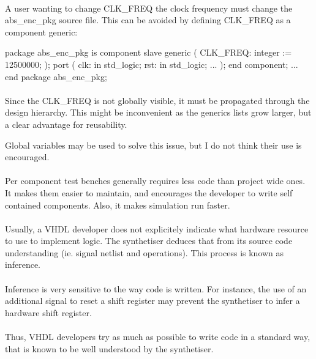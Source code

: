 \documentclass[12pt]{article}
\begin{document}
\paragraph{}
A user wanting to change CLK\_FREQ the clock frequency must change the
abs\_enc\_pkg source file. This can be avoided by defining CLK\_FREQ as
a component generic:
\pagebreak
\begin{vhdl}
package abs_enc_pkg is
component slave
generic
(
 CLK_FREQ: integer := 12500000;
);
port
(
 clk: in std_logic;
 rst: in std_logic;
 ...
);
end component;
...
end package abs_enc_pkg;
\end{vhdl}

\paragraph{}
Since the CLK\_FREQ is not globally visible, it must be propagated
through the design hierarchy. This might be inconvenient as the generics
lists grow larger, but a clear advantage for reusability.

\todo
{
 Global variables may be used to solve this issue,
 but I do not think their use is encouraged.
}


\paragraph{}
Per component test benches generally requires less code than
project wide ones. It makes them easier to maintain, and
encourages the developer to write self contained components.
Also, it makes simulation run faster.


\paragraph{}
Usually, a VHDL developer does not explicitely indicate what
hardware resource to use to implement logic. The synthetiser
deduces that from its source code understanding (ie. signal
netlist and operations). This process is known as inference.
\paragraph{}
Inference is very sensitive to the way code is written. For
instance, the use of an additional signal to reset a shift
register may prevent the synthetiser to infer a hardware
shift register.
\paragraph{}
Thus, VHDL developers try as much as possible to write code
in a standard way, that is known to be well understood by the
synthetiser.
\end{document}
